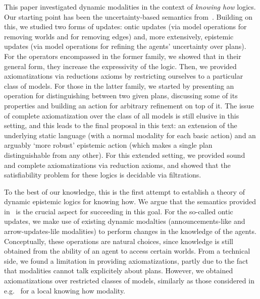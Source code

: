This paper investigated dynamic modalities in the context of \emph{knowing how} logics. Our starting point has been the uncertainty-based semantics from~\cite{AFSVQ21,AFSVQ23report}. 
Building on this, we studied two forms of updates: ontic updates (via model operations for removing worlds and for removing edges) and, more extensively, epistemic updates (via model operations for refining the agents' uncertainty over plans). For the operators encompassed in the former family, we showed that in their general form, they increase the expressivity of the logic. Then, we provided axiomatizations via reductions axioms by restricting ourselves to a particular class of models. For those in the latter family, we started by presenting an operation for distinguishing between two given plans, discussing some of its properties and building an action for arbitrary refinement on top of it. The issue of complete axiomatization over the class of all models is still elusive in this setting, and this leads to the final proposal in this text: an extension of the underlying static language (with a normal modality for each basic action) and an arguably `more robust' epistemic action (which makes a single plan distinguishable from any other). For this extended setting, we provided sound and complete axiomatizations via reduction axioms, and showed that the satisfiability problem for these logics is decidable via filtrations. 

To the best of our knowledge, this is the first attempt to establish a theory of dynamic epistemic logics for knowing how. We argue that the semantics provided in~\cite{AFSVQ21,AFSVQ23report} is the crucial aspect for succeeding in this goal. For the so-called ontic updates, we make use of existing dynamic modalties (announcements-like and arrow-updates-lile modalities) to perform changes in the knowledge of the agents. Conceptually, these operations are natural choices, since knowledge is still obtained from the ability of an agent to access certain worlds. From a technical side, we found a limitation in providing axiomatizations, partly due to the fact that modalities cannot talk explicitely about plans. However, we obtained axiomatizations over restricted classes of models, similarly as those considered in e.g.~\cite{Li21} for a local knowing how modality.

